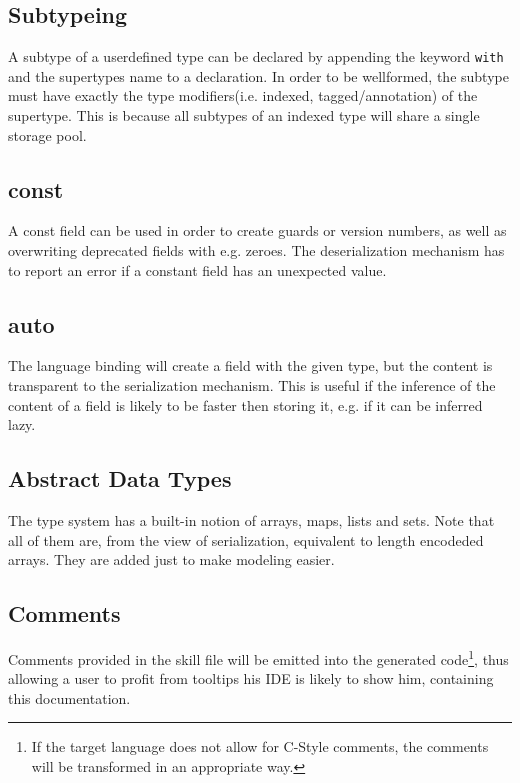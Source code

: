 \documentclass[a4paper,10pt]{article}
\begin{document}
\subsection{Subtypeing}
A subtype of a userdefined type can be declared by appending the keyword \texttt{with} and the supertypes name to a declaration. In order to be wellformed, the subtype must have exactly the type modifiers(i.e. indexed, tagged/annotation) of the supertype. This is because all subtypes of an indexed type will share a single storage pool.

\subsection{const}
A const field can be used in order to create guards or version numbers, as well as overwriting deprecated fields with e.g. zeroes. The deserialization mechanism has to report an error if a constant field has an unexpected value.

\subsection{auto}
The language binding will create a field with the given type, but the content is transparent to the serialization mechanism. This is useful if the inference of the content of a field is likely to be faster then storing it, e.g. if it can be inferred lazy.

\subsection{Abstract Data Types}
The type system has a built-in notion of arrays, maps, lists and sets. Note that all of them are, from the view of serialization, equivalent to length encodeded arrays. They are added just to make modeling easier. 

\subsection{Comments}
Comments provided in the skill file will be emitted into the generated code\footnote{If the target language does not allow for C-Style comments, the comments will be transformed in an appropriate way.}, thus allowing a user to profit from tooltips his IDE is likely to show him, containing this documentation. 
\end{document}
